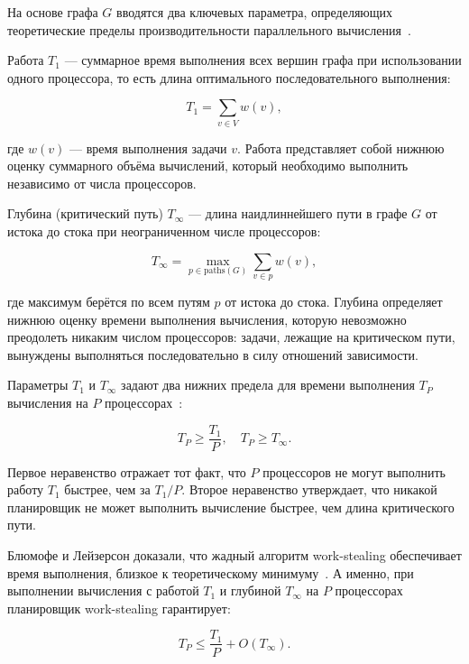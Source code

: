 На основе графа $G$ вводятся два ключевых параметра, определяющих
теоретические пределы производительности параллельного
вычисления~\cite{Blumofe1999}.

Работа $T_1$ --- суммарное время выполнения всех вершин графа
при использовании одного процессора, то есть длина оптимального
последовательного выполнения:

\begin{equation}
    T_1 = \sum_{v \in V} w(v),
    \label{eq:work}
\end{equation}

где $w(v)$ --- время выполнения задачи $v$. Работа представляет
собой нижнюю оценку суммарного объёма вычислений, который необходимо
выполнить независимо от числа процессоров.

Глубина (критический путь) $T_\infty$ --- длина наидлиннейшего
пути в графе $G$ от истока до стока при неограниченном числе
процессоров:

\begin{equation}
    T_\infty = \max_{p \in \text{paths}(G)} \sum_{v \in p} w(v),
    \label{eq:span}
\end{equation}

где максимум берётся по всем путям $p$ от истока до стока.
Глубина определяет нижнюю оценку времени выполнения вычисления,
которую невозможно преодолеть никаким числом процессоров: задачи,
лежащие на критическом пути, вынуждены выполняться последовательно
в силу отношений зависимости.

Параметры $T_1$ и $T_\infty$ задают два нижних предела для времени
выполнения $T_P$ вычисления на $P$ процессорах~\cite{Blumofe1999}:

\begin{equation}
    T_P \geq \frac{T_1}{P}, \quad T_P \geq T_\infty.
    \label{eq:lower-bounds}
\end{equation}

Первое неравенство отражает тот факт, что $P$ процессоров не могут
выполнить работу $T_1$ быстрее, чем за $T_1 / P$. Второе неравенство
утверждает, что никакой планировщик не может выполнить вычисление
быстрее, чем длина критического пути.

Блюмофе и Лейзерсон доказали, что жадный алгоритм work-stealing
обеспечивает время выполнения, близкое к теоретическому
минимуму~\cite{Blumofe1999}. А именно, при выполнении вычисления
с работой $T_1$ и глубиной $T_\infty$ на $P$ процессорах
планировщик work-stealing гарантирует:

\begin{equation}
    T_P \leq \frac{T_1}{P} + O(T_\infty).
    \label{eq:work-stealing-bound}
\end{equation}


